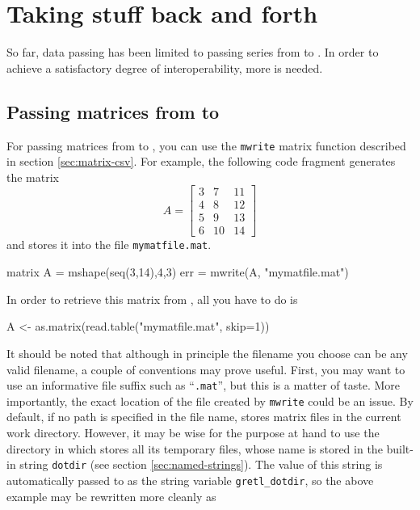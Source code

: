 \section{Taking stuff back and forth}
\label{sec:R-passing-data}

So far, data passing has been limited to passing series from
 to . In order to achieve a satisfactory degree of
interoperability, more is needed.

\subsection{Passing matrices from  to }

For passing matrices from  to , you can use the
\texttt{mwrite} matrix function described in section
\ref{sec:matrix-csv}. For example, the following  code
fragment generates the matrix 
\[ 
A = \left[
  \begin{array}{ccc}
    3 &  7 &  11 \\ 
    4 &  8 &  12 \\ 
    5 &  9 &  13 \\ 
    6 & 10 &  14 
  \end{array}
\right]
\] 
and stores it into the file \texttt{mymatfile.mat}.
\begin{code}
  matrix A = mshape(seq(3,14),4,3)
  err = mwrite(A, "mymatfile.mat")
\end{code}
In order to retrieve this matrix from , all you have to do is
\begin{code}
  A <- as.matrix(read.table("mymatfile.mat", skip=1))
\end{code}

It should be noted that although in principle the filename you choose
can be any valid filename, a couple of conventions may prove
useful. First, you may want to use an informative file suffix such as
``\texttt{.mat}'', but this is a matter of taste. More importantly,
the exact location of the file created by \texttt{mwrite} could be an
issue. By default, if no path is specified in the file name,
 stores matrix files in the current work
directory. However, it may be wise for the purpose at hand to use the
directory in which  stores all its temporary files, whose
name is stored in the built-in string \texttt{dotdir} (see section
\ref{sec:named-strings}). The value of this string is automatically
passed to  as the string variable \texttt{gretl\_dotdir}, so
the above example may be rewritten more cleanly as


